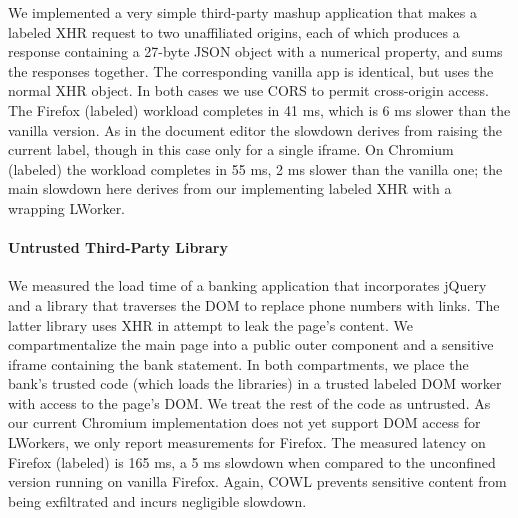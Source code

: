 We implemented a very simple third-party mashup application that makes
a labeled XHR request to two unaffiliated origins, each of which produces a
response containing a 27-byte JSON object with a numerical property,
and sums the responses together.
%
The corresponding vanilla app is identical, but uses the normal XHR
object.
%
In both cases we use CORS to permit cross-origin access.
%
The Firefox (labeled) workload completes in 41 ms, which is 6 ms slower
than the vanilla version.
%
As in the document editor the slowdown derives from raising the
current label, though in this case only for a single iframe.
%
On Chromium (labeled) the workload completes in 55 ms, 2 ms
slower than the vanilla one; the main slowdown here derives from
our implementing labeled XHR with a wrapping LWorker.

\paragraph{Untrusted Third-Party Library}

We measured the load time of a banking application that incorporates
jQuery and a library that traverses the DOM to replace phone numbers
with links.
%
The latter library uses XHR in attempt to leak the page's content.
%
We compartmentalize the main page into a public outer component and a
sensitive iframe containing the bank statement. In both
compartments, we place the bank's trusted code (which loads the
libraries) in a trusted labeled DOM worker with access to the page's
DOM. We treat the rest of the code as untrusted.
%
As our current Chromium implementation does not yet support DOM access
for LWorkers, we only report measurements for Firefox.
%
The measured latency on Firefox (labeled) is 165 ms, a 5 ms
slowdown when compared to the unconfined version running on vanilla
Firefox.
%
%
Again, COWL prevents sensitive content from being exfiltrated and incurs
negligible slowdown.





